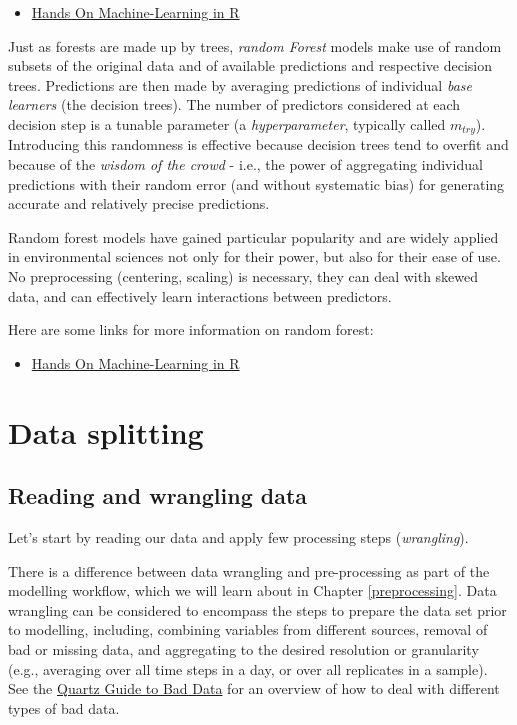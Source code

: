 \documentclass[
]{book}
\providecommand{\tightlist}{%
  \setlength{\itemsep}{0pt}\setlength{\parskip}{0pt}}
\begin{document}
\begin{itemize}
\tightlist
\item
  \href{https://bradleyboehmke.github.io/HOML/DT.html}{Hands On Machine-Learning in R}
\end{itemize}

Just as forests are made up by trees, \emph{random Forest} models make use of random subsets of the original data and of available predictions and respective decision trees. Predictions are then made by averaging predictions of individual \emph{base learners} (the decision trees). The number of predictors considered at each decision step is a tunable parameter (a \emph{hyperparameter}, typically called \(m_{try}\)). Introducing this randomness is effective because decision trees tend to overfit and because of the \emph{wisdom of the crowd} - i.e., the power of aggregating individual predictions with their random error (and without systematic bias) for generating accurate and relatively precise predictions.

Random forest models have gained particular popularity and are widely applied in environmental sciences not only for their power, but also for their ease of use. No preprocessing (centering, scaling) is necessary, they can deal with skewed data, and can effectively learn interactions between predictors.

Here are some links for more information on random forest:

\begin{itemize}
\tightlist
\item
  \href{https://bradleyboehmke.github.io/HOML/random-forest.html}{Hands On Machine-Learning in R}
\end{itemize}

\hypertarget{data-splitting}{%
\chapter{Data splitting}\label{data-splitting}}

\hypertarget{reading-and-wrangling-data}{%
\section{Reading and wrangling data}\label{reading-and-wrangling-data}}

Let's start by reading our data and apply few processing steps (\emph{wrangling}).

There is a difference between data wrangling and pre-processing as part of the modelling workflow, which we will learn about in Chapter \ref{preprocessing}. Data wrangling can be considered to encompass the steps to prepare the data set prior to modelling, including, combining variables from different sources, removal of bad or missing data, and aggregating to the desired resolution or granularity (e.g., averaging over all time steps in a day, or over all replicates in a sample). See the \href{https://github.com/Quartz/bad-data-guide}{Quartz Guide to Bad Data} for an overview of how to deal with different types of bad data.
\end{document}
